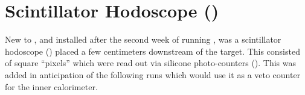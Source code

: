 \section{\label{sec:clas.sh}Scintillator Hodoscope ()}


New to , and installed after the second week of running , was a scintillator hodoscope () placed a few centimeters downstream of the target. This consisted of square ``pixels'' which were read out via silicone photo-counters (). This was added in anticipation of the following runs which would use it as a veto counter for the inner calorimeter.

